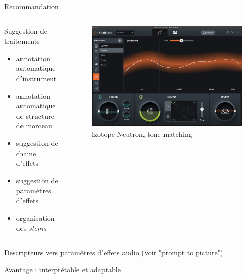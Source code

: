 \documentclass[9pt, aspectratio=169]{beamer}
\begin{document}
\begin{frame}{Recommandation} %

\begin{columns}
    \begin{column}{0.48\textwidth}
	    Suggestion de traitements
		\begin{itemize}
			\item annotation automatique d'instrument
			\item annotation automatique de structure de morceau \cite{hargreaves_structural_2012}
			\item suggestion de chaine d'effets \cite{sauer_recommending_2013}
			\item suggestion de paramètres d'effets
			\item organisation des \emph{stems}
		\end{itemize}
    \end{column}
    \begin{column}{0.48\textwidth}
		\begin{figure}
			\includegraphics[width=\textwidth]{fig/neutron_spectrum_suggestion.jpg}
			\caption{Izotope Neutron, tone matching}
		\end{figure}
    \end{column}
\end{columns}
Descripteurs vers paramètres d'effets audio (voir "prompt to picture")

Avantage : interprétable et adaptable
\end{frame}
\end{document}
